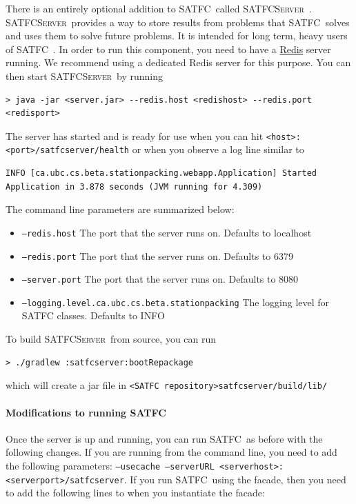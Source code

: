 \documentclass[
10pt, %
letterpaper, %
oneside, %
headinclude,footinclude, %
BCOR5mm, %
needspace, %
]{scrartcl}
\newcommand{\SATFC}{\textsc{SATFC}~}
\newcommand{\SATFCServer}{\textsc{SATFCServer}~}
\begin{document}
There is an entirely optional addition to \SATFC called \SATFCServer. \SATFCServer provides a way to store results from problems that \SATFC solves and uses them to solve future problems. It is intended for long term, heavy users of \SATFC. In order to run this component, you need to have a \href{http://redis.io/}{Redis} server running. We recommend using a dedicated Redis server for this purpose. You can then start \SATFCServer by running
\begin{lstlisting}[style=Bash]
> java -jar <server.jar> --redis.host <redishost> --redis.port <redisport>
\end{lstlisting}
The server has started and is ready for use when you can hit \texttt{<host>:<port>/satfcserver/health} or when you observe a log line similar to 
\begin{lstlisting}[style=Bash]
INFO [ca.ubc.cs.beta.stationpacking.webapp.Application] Started Application in 3.878 seconds (JVM running for 4.309)
\end{lstlisting}
The command line parameters are summarized below:
\begin{itemize}
\item \texttt{--redis.host} The port that the server runs on. Defaults to localhost
\item \texttt{--redis.port} The port that the server runs on. Defaults to 6379
\item \texttt{--server.port} The port that the server runs on. Defaults to 8080
\item \texttt{--logging.level.ca.ubc.cs.beta.stationpacking} The logging level for SATFC classes. Defaults to INFO
\end{itemize}
To build \SATFCServer from source, you can run 
\begin{lstlisting}[style=Bash]
> ./gradlew :satfcserver:bootRepackage
\end{lstlisting}
which will create a jar file in \texttt{<SATFC repository>satfcserver/build/lib/}

\paragraph{Modifications to running \SATFC}
Once the server is up and running, you can run \SATFC as before with the following changes. If you are running from the command line, you need to add the following parameters: \texttt{--usecache --serverURL <serverhost>:<serverport>/satfcserver}. If you run \SATFC using the facade, then you need to add the following lines to when you instantiate the facade:
\end{document}
